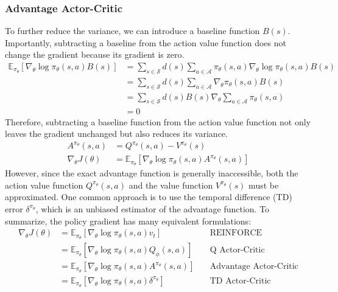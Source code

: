 \subsubsection{Advantage Actor-Critic}
To further reduce the variance, we can introduce a baseline function $B(s)$.
Importantly, subtracting a baseline from the action value function does not change the gradient because its gradient is zero.
\begin{equation}
  \begin{aligned}
    \mathbb{E}_{\pi_\theta} [\nabla_\theta \log \pi_\theta(s, a) B(s)]
    &= \sum_{s \in \mathcal{S}} d(s) \sum_{a \in \mathcal{A}} \pi_\theta(s, a) \nabla_\theta \log \pi_\theta(s, a) B(s) \\
    &= \sum_{s \in \mathcal{S}} d(s) \sum_{a \in \mathcal{A}} \nabla_\theta \pi_\theta(s, a) B(s) \\
    &= \sum_{s \in \mathcal{S}} d(s) B(s) \nabla_\theta \sum_{a \in \mathcal{A}} \pi_\theta(s, a) \\
    &= 0
  \end{aligned}
\end{equation}
Therefore, subtracting a baseline function from the action value function not only leaves the gradient unchanged but also reduces its variance.
\begin{equation} \label{chap2:eq:pg_adv}
  \begin{aligned}
    A^{\pi_\theta}(s, a) &= Q^{\pi_\theta}(s, a) - V^{\pi_\theta}(s) \\
    \nabla_\theta J(\theta) &= \mathbb{E}_{\pi_\theta} [\nabla_\theta \log \pi_\theta(s, a) A^{\pi_\theta}(s, a)]
  \end{aligned}
\end{equation}
However, since the exact advantage function is generally inaccessible, both the action value function $Q^{\pi_\theta}(s, a)$ and the value function $V^{\pi_\theta}(s)$ must be approximated.
One common approach is to use the temporal difference (TD) error $\delta^{\pi_\theta}$, which is an unbiased estimator of the advantage function.
To summarize, the policy gradient has many equivalent formulations:
\begin{equation}
  \begin{aligned}
    \nabla_\theta J(\theta)
    &= \mathbb{E}_{\pi_\theta}[\nabla_\theta \log \pi_\theta(s, a) v_t] &\quad \text{REINFORCE} \\
    &= \mathbb{E}_{\pi_\theta}[\nabla_\theta \log \pi_\theta(s, a) Q_\phi(s, a)] &\quad \text{Q Actor-Critic} \\
    &= \mathbb{E}_{\pi_\theta}[\nabla_\theta \log \pi_\theta(s, a) A^{\pi_\theta}(s, a)] &\quad \text{Advantage Actor-Critic} \\
    &= \mathbb{E}_{\pi_\theta}[\nabla_\theta \log \pi_\theta(s, a) \delta^{\pi_\theta}] &\quad \text{TD Actor-Critic}
  \end{aligned}
\end{equation}

